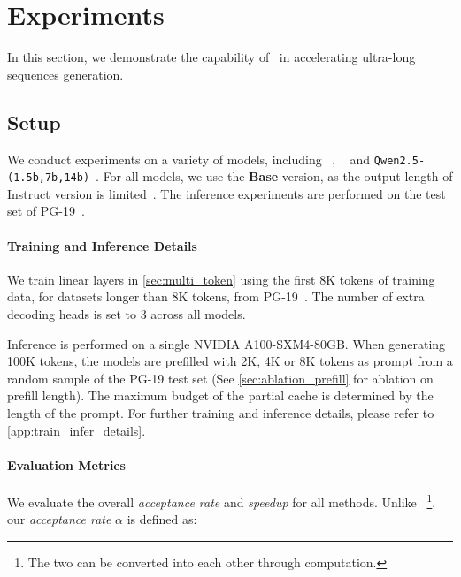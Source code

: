 \section{Experiments}
\label{sec:exp}
In this section, we demonstrate the capability of \ours~in accelerating ultra-long sequences generation. 

\subsection{Setup}
We conduct experiments on a variety of models, including \yarnllama~\citep{yarn}, \llama~\citep{llama3} and \texttt{Qwen2.5-(1.5b,7b,14b)}~\citep{qwen2.5}. For all models, we use the \textbf{Base} version, as the output length of Instruct version is limited~\citep{longwriter}. The inference experiments are performed on the test set of PG-19~\citep{pg19}.
\paragraph{Training and Inference Details}
We train linear layers in \cref{sec:multi_token} using the first 8K tokens of training data, for datasets longer than 8K tokens, from PG-19~\citep{pg19}. The number of extra decoding heads is set to 3 across all models. 

Inference is performed on a single NVIDIA A100-SXM4-80GB. When generating 100K tokens, the models are prefilled with 2K, 4K or 8K tokens as prompt from a random sample of the PG-19 test set (See \cref{sec:ablation_prefill} for ablation on prefill length). The maximum budget of the partial cache is determined by the length of the prompt. For further training and inference details, please refer to \cref{app:train_infer_details}.

\paragraph{Evaluation Metrics}
We evaluate the overall \emph{acceptance rate} and \emph{speedup} for all methods. Unlike ~\citet{sd1}\footnote{The two can be converted into each other through computation.}, our \emph{acceptance rate} $\alpha$ is defined as:

